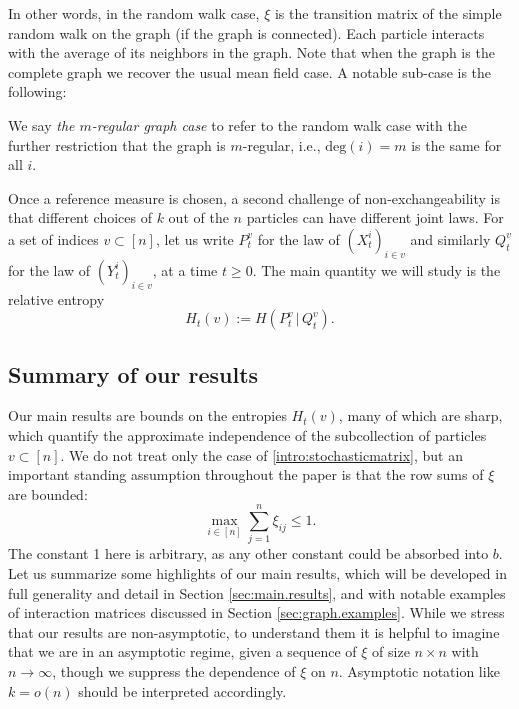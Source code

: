 \documentclass[11pt,reqno]{amsart}
\numberwithin{equation}{section}
\theoremstyle{definition}
\begin{document}
In other words, in the random walk case, $\xi$ is the transition matrix of the simple random walk on the graph (if the graph is connected). Each particle interacts with the average of its neighbors in the graph. Note that when the graph is the complete graph we recover the usual mean field case. A notable sub-case is the following:

\begin{definition} \label{def:m-regular-case}
We say \emph{the $m$-regular graph case} to refer to the random walk case with the further restriction that the graph is $m$-regular, i.e., $\mathrm{deg}(i)=m$ is the same for all $i$. 
\end{definition}
 



Once a reference measure is chosen, a second challenge of non-exchangeability is that different choices of $k$ out of the $n$ particles can have different joint laws.
For a  set of indices $v \subset [n]$, let us write $P^v_t$ for the law of $(X^i_t)_{i \in v}$  and similarly $Q^v_t$ for the law of $(Y^i_t)_{i \in v}$, at a time $t \ge 0$. The main quantity we will study is the relative entropy
\[
H_t(v) := H(P^v_t\,|\,Q^v_t).
\]


\subsection{Summary of our results} \label{se:intro:summary}
Our main results are bounds on the entropies $H_t(v)$, many of which are sharp, which quantify the   approximate independence of the subcollection of particles $v \subset [n]$. 
We do not treat only the case of \eqref{intro:stochasticmatrix}, but an important standing assumption throughout the paper is that the row sums of $\xi$ are bounded:
\begin{equation}
\max_{i \in [n]}\sum_{j=1}^n\xi_{ij} \le 1 . \label{intro:sums-row}
\end{equation}
The constant 1 here is arbitrary, as any other constant could be absorbed into $b$. 
Let us summarize some highlights of our main results, which will be developed in full generality and detail in Section \ref{sec:main.results}, and with notable examples of interaction matrices discussed in Section \ref{sec:graph.examples}.  While we stress that our results are non-asymptotic, to understand them it is helpful to  imagine that we are in an asymptotic regime, given a sequence of $\xi$ of size $n \times n$ with $n \to\infty$, though we suppress the dependence of $\xi$ on $n$. Asymptotic notation like $k=o(n)$ should be interpreted accordingly. 
\end{document}
